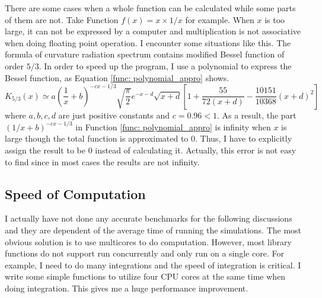 \documentclass[12pt]{report}
\begin{document}
          There are some cases when a whole function can be calculated while some parts of them 
          are not. Take Function $f\left(x\right) = x\times1/x$ for example. When $x$ is too 
          large, it can not be expressed by a computer and multiplication is not associative when 
          doing floating point operation. I encounter some situations like this.
          The formula of curvature radiation spectrum contains modified Bessel function of order 
          $5/3$. In order to speed up the program, I use a polynomial to express the Bessel 
          function, as Equation \ref{func: polynomial_appro} shows. 
          \begin{equation}
            K_{5/3} \left(x\right) \simeq a \left(\frac{1}{x} + b\right)^{-cx - 1/3} \sqrt{\frac{\pi}{2}} e^{-x - d} \sqrt{x + d} %
            \left[1 + \frac{55}{72\left(x + d\right)} - \frac{10151}{10368}\left(x+d\right)^2\right] 
            \label{func: polynomial_appro}
          \end{equation}
          where $a,b,c,d$ are just positive constants and $c = 0.96 < 1$. As a result, 
          the part $(1/x + b)^{-cx - 1/3}$ in Function \ref{func: polynomial_appro} is infinity
          when $x$ is large though the total function is approximated to $0$. Thus, I have to 
          explicitly assign the result to be $0$ instead of calculating it. Actually, this error 
          is not easy to find since in most cases the results are not infinity. 
          
        \subsection{Speed of Computation}
          I actually have not done any accurate benchmarks for the following discussions and they are 
          dependent of the average time of running the simulations.
          The most obvious solution is to use multicores to do computation. However, most library functions 
          do not support run concurrently and only run on a single core. For example, I need to do many 
          integrations and the speed of integration is critical. I write some simple functions to 
          utilize four CPU cores at the same time when doing integration. 
          This gives me a huge performance improvement.
\end{document}
